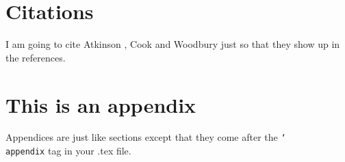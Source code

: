\documentclass[12pt]{article}
\begin{document}
\newpage
\section{Citations}
I am going to cite Atkinson \cite{atkinson85}, Cook \cite{cook77} and Woodbury \cite{woodbury50} just so that they show up in the references.


\newpage
\appendix
\section{This is an appendix}

Appendices are just like sections except that they come after the \texttt{\char`\\appendix} tag in your .tex file.

\newpage



\end{document}
